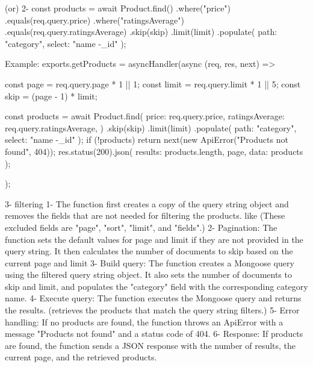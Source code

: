      (or)  2-   const products = await Product.find({})
                                                .where("price")
                                                .equals(req.query.price)
                                                .where("ratingsAverage")
                                                .equals(req.query.ratingsAverage)
                                                .skip(skip)
                                                .limit(limit)
                                                .populate({ path: "category", select: "name -_id" });

        Example: 
                    exports.getProducts = asyncHandler(async (req, res, next) => {
                            const page = req.query.page * 1 || 1;
                            const limit = req.query.limit * 1 || 5;
                            const skip = (page - 1) * limit;

                            const products = await Product.find({
                                price: req.query.price,
                                ratingsAverage: req.query.ratingsAverage,
                            })
                                .skip(skip)
                                .limit(limit)
                                .populate({ path: "category", select: "name -_id" });
                            if (!products) {
                                return next(new ApiError("Products not found", 404));
                            }
                            res.status(200).json({ results: products.length, page, data: products });
                        });


      3- filtering 
            1- The function first creates a copy of the query string object and removes the fields that are not needed for filtering the products. like (These excluded fields are "page", "sort", "limit", and "fields".)
            2- Pagination: The function sets the default values for page and limit if they are not provided in the query string. It then calculates the number of documents to skip based on the current page and limit
            3- Build query: The function creates a Mongoose query using the filtered query string object. It also sets the number of documents to skip and limit, and populates the "category" field with the corresponding category name.
            4- Execute query: The function executes the Mongoose query and returns the results. (retrieves the products that match the query string filters.)
            5- Error handling: If no products are found, the function throws an ApiError with a message "Products not found" and a status code of 404.
            6- Response: If products are found, the function sends a JSON response with the number of results, the current page, and the retrieved products.

